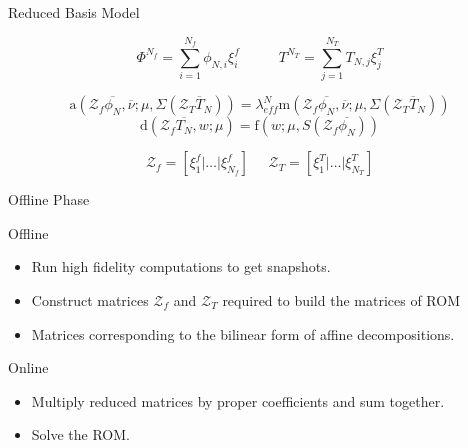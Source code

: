 \documentclass{beamer}
\renewcommand{\vec}[1]{\ensuremath{\overline{#1}}}
\begin{document}
\begin{frame}{Reduced Basis Model}
    \begin{exampleblock}{}
        \[{\Phi}^{N_f} = \sum_{i=1}^{N_f}\phi_{N,i}\xi_i^f \mspace{50mu} T^{N_T} = \sum_{j=1}^{N_T}T_{N,j}\xi_j^T\]
    \end{exampleblock}
    \begin{block}{}
        \[\mathrm{a}(\mathcal{Z}_f \vec{\phi_N},\vec{\nu};\mu,\Sigma(\mathcal{Z}_T \vec{T}_N)) = \lambda_{eff}^N \mathrm{m}(\mathcal{Z}_f \vec{\phi_N},\vec{\nu};\mu,\Sigma(\mathcal{Z}_T \vec{T}_N))\]
        \[\mathrm{d}(\mathcal{Z}_f \vec{T_N},w;\mu) = \mathrm{f}(w;\mu, S(\mathcal{Z}_f \vec{\phi_N}))\]
          \end{block}
    \begin{exampleblock}{}
        \[\mathcal{Z}_f = [\xi_1^f| \dots| \xi_{N_f}^f] \mspace{25mu} \mathcal{Z}_T = [\xi_1^T| \dots| \xi_{N_T}^T]\]
    \end{exampleblock} 
\end{frame}

\begin{frame}{Offline Phase}
\begin{block}{Offline}
    \begin{itemize}
        \item Run high fidelity computations to get snapshots.
        \item Construct matrices $\mathcal{Z}_f$ and $\mathcal{Z}_T$ required to build the matrices of ROM
        \item Matrices corresponding to the bilinear form of affine decompositions. 
    \end{itemize}
\end{block}

\begin{block}{Online}
    \begin{itemize}
        \item Multiply reduced matrices by proper coefficients and sum together.
        \item Solve the ROM.
    \end{itemize}
\end{block}
\end{frame}
\end{document}
